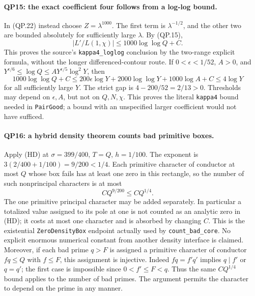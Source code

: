 \paragraph{QP15: the exact coefficient four follows from a log-log bound.}
In (QP.22) instead choose $Z=\lambda^{1000}$.
The first term is $\lambda^{-1/2}$, and the other two are bounded
absolutely for sufficiently large $\lambda$.
By (QP.15),
\[
 |L'/L(1,\chi)|\le1000\log\log Q+C.                  \tag{QP.24}
\]
This proves the source's \texttt{kappa4\_loglog} conclusion by the
two-range explicit formula, without the longer differenced-contour route.
If $0<\epsilon<1/52$, $A>0$, and
$Y^{\epsilon/6}\le\log Q\le A Y^{\epsilon/5}\log^2Y$, then
\[
 1000\log\log Q+C
 \le200\epsilon\log Y+2000\log\log Y+1000\log A+C
                                                    \le4\log Y
                                                               \tag{QP.25}
\]
for all sufficiently large $Y$.  The strict gap is
$4-200/52=2/13>0$.  Thresholds may depend on $\epsilon,A$, but not on
$Q,N,\chi$.  This proves the literal \texttt{kappa4} bound needed in
\texttt{PairGood}; a bound with an unspecified larger coefficient would
not have sufficed.

\paragraph{QP16: a hybrid density theorem counts bad primitive boxes.}
Apply (HD) at $\sigma=399/400$, $T=Q$, $h=1/100$.
The exponent is
$3(2/400+1/100)=9/200<1/4$.  Each primitive character of conductor
at most $Q$ whose box fails has at least one zero in this rectangle,
so the number of such nonprincipal characters is at most
\[
                             C Q^{9/200}\le C Q^{1/4}.\tag{QP.26}
\]
The one primitive principal character may be added separately.  In
particular a totalized value assigned to its pole at one is not counted
as an analytic zero in (HD); it costs at most one character and is
absorbed by changing $C$.  This is the existential
\texttt{ZeroDensityBox} endpoint actually used
by \texttt{count\_bad\_core}.  No explicit enormous numerical constant
from another density interface is claimed.
Moreover, if each bad prime $q>F$ is assigned a primitive character of
conductor $fq\le Q$ with $f\le F$, this assignment is injective.
Indeed $fq=f'q'$ implies $q\mid f'$ or $q=q'$; the first case is
impossible since $0<f'\le F<q$.  Thus the same $CQ^{1/4}$ bound applies
to the number of bad primes.  The argument permits the character to
depend on the prime in any manner.

